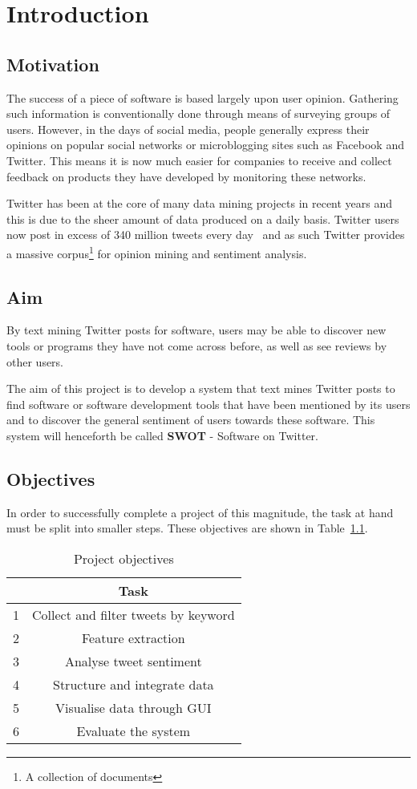\chapter{Introduction}
\label{cha:intro}

\section{Motivation}
The success of a piece of software is based largely upon user opinion. Gathering such information is conventionally done through means of surveying groups of users. However, in the days of social media, people generally express their opinions on popular social networks or microblogging sites such as Facebook and Twitter. This means it is now much easier for companies to receive and collect feedback on products they have developed by monitoring these networks.

Twitter has been at the core of many data mining projects in recent years and this is due to the sheer amount of data produced on a daily basis. Twitter users now post in excess of 340 million tweets every day~\cite{twitterblog} and as such Twitter provides a massive corpus\footnote{A collection of documents} for opinion mining and sentiment analysis.

\section{Aim}
\label{sec:aim}
By text mining Twitter posts for software, users may be able to discover new tools or programs they have not come across before, as well as see reviews by other users.

The aim of this project is to develop a system that text mines Twitter posts to find software or software development tools that have been mentioned by its users and to discover the general sentiment of users towards these software. This system will henceforth be called \textbf{SWOT} - Software on Twitter.

\section{Objectives}
In order to successfully complete a project of this magnitude, the task at hand must be split into smaller steps.  These objectives are shown in Table~\ref{objectives}.

\begin{table}
\begin{center}
\begin{tabular}{|r|c|}\hline\hline
&\textbf{Task}\\\hline
1&Collect and filter tweets by keyword\\
2&Feature extraction\\
3&Analyse tweet sentiment\\
4&Structure and integrate data\\
5&Visualise data through GUI\\
6&Evaluate the system\\\hline\hline
\end{tabular}
\end{center}
\caption{Project objectives}\label{objectives}
\end{table}

